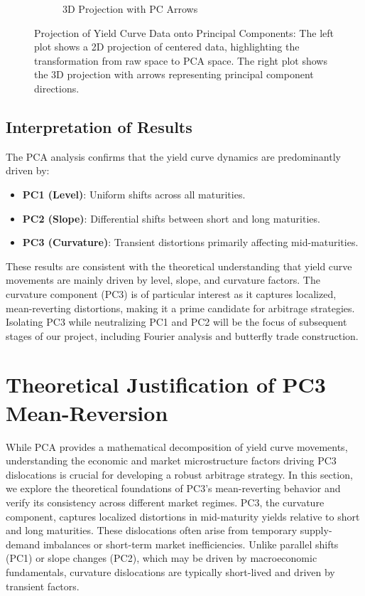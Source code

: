 \documentclass[12pt]{article}
\begin{document}
\begin{figure}[H]
\begin{subfigure}[b]{0.48\textwidth}
        \caption{3D Projection with PC Arrows}
    \end{subfigure}
    \caption{Projection of Yield Curve Data onto Principal Components: The left plot shows a 2D projection of centered data, highlighting the transformation from raw space to PCA space. The right plot shows the 3D projection with arrows representing principal component directions.}
   \label{fig:projection_int}
\end{figure}

\subsection{Interpretation of Results}

The PCA analysis confirms that the yield curve dynamics are predominantly driven by:
\begin{itemize}
    \item \textbf{PC1 (Level)}: Uniform shifts across all maturities.
    \item \textbf{PC2 (Slope)}: Differential shifts between short and long maturities.
    \item \textbf{PC3 (Curvature)}: Transient distortions primarily affecting mid-maturities.
\end{itemize}

These results are consistent with the theoretical understanding that yield curve movements are mainly driven by level, slope, and curvature factors. The curvature component (PC3) is of particular interest as it captures localized, mean-reverting distortions, making it a prime candidate for arbitrage strategies. Isolating PC3 while neutralizing PC1 and PC2 will be the focus of subsequent stages of our project, including Fourier analysis and butterfly trade construction.

\section{Theoretical Justification of PC3 Mean-Reversion}

While PCA provides a mathematical decomposition of yield curve movements, understanding the economic and market microstructure factors driving PC3 dislocations is crucial for developing a robust arbitrage strategy. In this section, we explore the theoretical foundations of PC3’s mean-reverting behavior and verify its consistency across different market regimes. PC3, the curvature component, captures localized distortions in mid-maturity yields relative to short and long maturities. These dislocations often arise from temporary supply-demand imbalances or short-term market inefficiencies. Unlike parallel shifts (PC1) or slope changes (PC2), which may be driven by macroeconomic fundamentals, curvature dislocations are typically short-lived and driven by transient factors.
\end{document}
